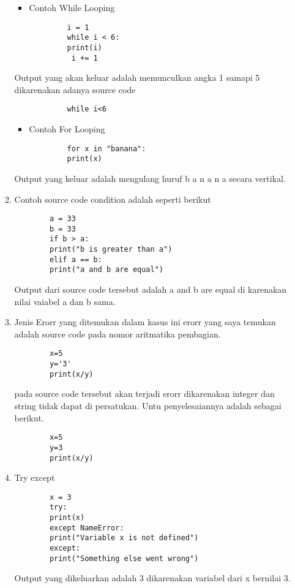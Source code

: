 \begin{enumerate}
\begin{enumerate}
	\begin{itemize}
	\item Contoh While Looping
	\end{itemize}
		\begin{verbatim}
			i = 1
			while i < 6:
		  	print(i)
 			 i += 1
		\end{verbatim}
	\subitem Output yang akan keluar adalah memunculkan angka 1 samapi 5 dikarenakan adanya source code
		\begin{verbatim}
			while i<6
		\end{verbatim}
	\begin{itemize}
	\item Contoh For Looping
	\end{itemize}
		\begin{verbatim}
			for x in "banana":
			print(x)
		\end{verbatim}
	\subitem Output yang keluar adalah mengulang huruf b a n a n a secara vertikal.
\par
\item Contoh source code condition adalah seperti berikut
	\begin{verbatim}
		a = 33
		b = 33
		if b > a:
  		print("b is greater than a")
		elif a == b:
  		print("a and b are equal")
	\end{verbatim}
\subitem Output dari source code tersebut adalah a and b are equal di karenakan nilai vaiabel a dan b sama.

\par
\item Jenis Erorr yang ditemukan
\subitem dalam kasus ini erorr yang saya temukan adalah source code pada nomor aritmatika pembagian.
	\begin{verbatim}
		x=5
		y='3'
		print(x/y)
	\end{verbatim}
\subitem pada source code tersebut akan terjadi erorr dikarenakan integer dan string tidak dapat di persatukan. Untu penyelesaiannya adalah sebagai berikut.
	\begin{verbatim}
		x=5
		y=3
		print(x/y)
	\end{verbatim}
\par
\item Try except
	\begin{verbatim}
		x = 3
		try:
		print(x)
		except NameError:
		print("Variable x is not defined")
		except:
		print("Something else went wrong")
	\end{verbatim}
\subitem Output yang dikeluarkan adalah 3 dikarenakan variabel dari x bernilai 3.
\end{enumerate}


\end{enumerate}

